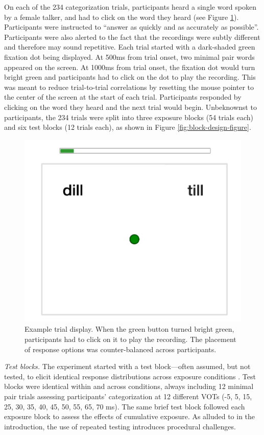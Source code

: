 \documentclass[
  11pt,
  man,mask,floatsintext]{apa6}
\begin{document}
On each of the 234 categorization trials, participants heard a single word spoken by a female talker, and had to click on the word they heard (see Figure \ref{fig:example-trial}). Participants were instructed to ``answer as quickly and as accurately as possible''. Participants were also alerted to the fact that the recordings were subtly different and therefore may sound repetitive. Each trial started with a dark-shaded green fixation dot being displayed. At 500ms from trial onset, two minimal pair words appeared on the screen. At 1000ms from trial onset, the fixation dot would turn bright green and participants had to click on the dot to play the recording. This was meant to reduce trial-to-trial correlations by resetting the mouse pointer to the center of the screen at the start of each trial. Participants responded by clicking on the word they heard and the next trial would begin. Unbeknownst to participants, the 234 trials were split into three exposure blocks (54 trials each) and six test blocks (12 trials each), as shown in Figure \ref{fig:block-design-figure}.

\begin{figure}

{\centering \includegraphics[width=0.33\linewidth]{../figures/trial_example} 

}

\caption{Example trial display. When the green button turned bright green, participants had to click on it to play the recording. The placement of response options was counter-balanced across participants.}\label{fig:example-trial}
\end{figure}

\emph{Test blocks. } The experiment started with a test block---often assumed, but not tested, to elicit identical response distributions across exposure conditions \autocites[see also][]{colby2018,xie2021cognition}. Test blocks were identical within and across conditions, always including 12 minimal pair trials assessing participants' categorization at 12 different VOTs (-5, 5, 15, 25, 30, 35, 40, 45, 50, 55, 65, 70 ms). The same brief test block followed each exposure block to assess the effects of cumulative exposure. As alluded to in the introduction, the use of repeated testing introduces procedural challenges.
\end{document}
